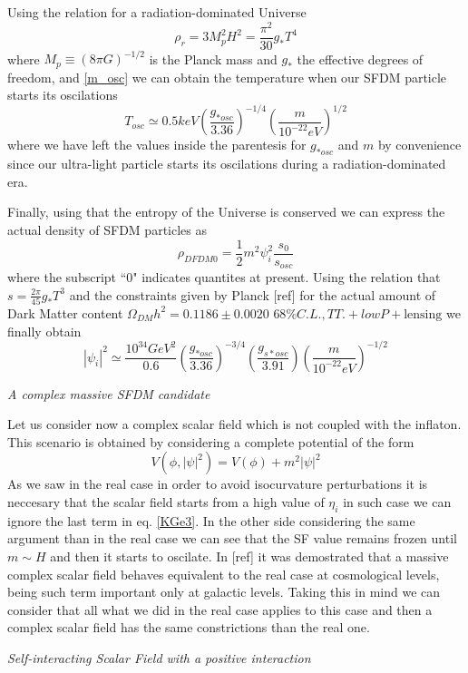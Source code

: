 \documentclass[twocolumn,           %
               showpacs,            %
               preprintnumbers,     %
               aps,                 %
               prl,          	    %
               letterpaper,             %
               superscriptaddress,      %
               nofootinbib,         %
               tightenlines,        %
               floats,floatfix      %
               ,usenatbib,
               ]{revtex4-1}
\begin{document}
Using the relation for a radiation-dominated Universe
\begin{equation}
\rho_r = 3M_p^2H^2=\frac{\pi^2}{30}g_*T^4
\end{equation}
where $M_p\equiv (8\pi G)^{-1/2}$ is the Planck mass and $g_*$ the effective degrees of freedom, and \eqref{m_osc} we can obtain the temperature when our SFDM particle starts its oscilations
\begin{equation}
T_{osc}\simeq 0.5 keV\left(\frac{g_{*osc}}{3.36}\right)^{-1/4}\left(\frac{m}{10^{-22}eV}\right)^{1/2}
\end{equation}
where we have left the values inside the parentesis for $g_{*osc}$ and $m$ by convenience since our ultra-light particle starts its oscilations during a radiation-dominated era. 

Finally, using that the entropy of the Universe is conserved we can express the actual density of SFDM particles as
\begin{equation}
\rho_{DFDM0}=\frac{1}{2}m^2\psi_i^2\frac{s_0}{s_{osc}}
\end{equation}
where the subscript ``$0$" indicates quantites at present. Using the relation that $s=\frac{2\pi}{45}g_{*}T^3$ and the constraints given by Planck [ref] for the actual amount of Dark Matter content $\Omega_{DM}h^2=0.1186\pm 0.0020$ $68\% C.L., TT. + lowP+\text{lensing}$ we finally obtain 
\begin{equation}\label{phi_im2}
|\psi_i|^2\simeq\frac{10^{34}GeV^2}{0.6}\left(\frac{g_{*osc}}{3.36}\right)^{-3/4}\left(\frac{g_{s*osc}}{3.91}\right)\left(\frac{m}{10^{-22}eV}\right)^{-1/2}
\end{equation}

\begin{center}
\textit{A complex massive SFDM candidate}
\end{center}

Let us consider now a complex scalar field which is not coupled with the inflaton. This scenario is obtained by considering a complete potential of the form
\begin{equation}
V(\phi,|\psi|^2)=V(\phi)+m^2|\psi|^2
\end{equation}
As we saw in the real case in order to avoid isocurvature perturbations it is neccesary that the scalar field starts from a high value of $\eta_i$ in such case we can ignore the last term in eq. \eqref{KGe3}. In the other side considering the same argument than in the real case we can see that the SF value remains frozen until $m\sim H$ and then it starts to oscilate. In [ref] it was demostrated that a massive complex scalar field behaves equivalent to the real case at cosmological levels, being such term important only at galactic levels. Taking this in mind we can consider that all what we did in the real case applies to this case and then a complex scalar field has the same constrictions than the real one. 
\begin{center}
\textit{Self-interacting Scalar Field with a positive interaction}
\end{center}
\end{document}
